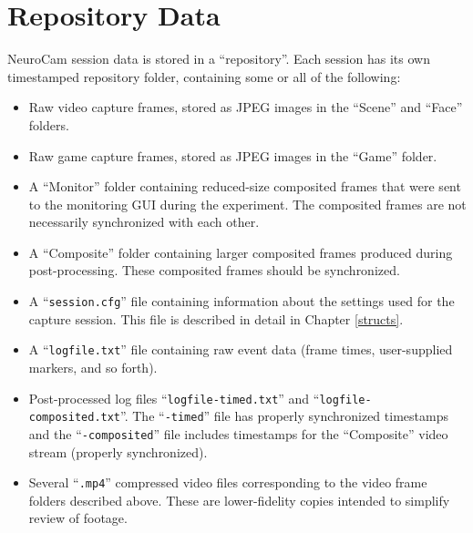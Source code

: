 
\chapter{Repository Data}
\label{repo}

NeuroCam session data is stored in a ``repository''. Each session has its
own timestamped repository folder, containing some or all of the following:

\begin{itemize}

\item Raw video capture frames, stored as JPEG images in the ``Scene''
and ``Face'' folders.
\item Raw game capture frames, stored as JPEG images in the ``Game'' folder.

\item A ``Monitor'' folder containing reduced-size composited frames that
were sent to the monitoring GUI during the experiment. The composited frames
are not necessarily synchronized with each other.

\item A ``Composite'' folder containing larger composited frames produced
during post-processing. These composited frames should be synchronized.

\item A ``\verb+session.cfg+'' file containing information about the
settings used for the capture session. This file is described in detail in
Chapter \ref{structs}.

\item A ``\verb+logfile.txt+'' file containing raw event data (frame times,
user-supplied markers, and so forth).

\item Post-processed log files ``\verb+logfile-timed.txt+'' and
``\verb+logfile-composited.txt+''. The ``\verb+-timed+'' file has properly
synchronized timestamps and the ``\verb+-composited+'' file includes
timestamps for the ``Composite'' video stream (properly synchronized).

\item Several ``\verb+.mp4+'' compressed video files corresponding to the
video frame folders described above. These are lower-fidelity copies intended
to simplify review of footage.

\end{itemize}

